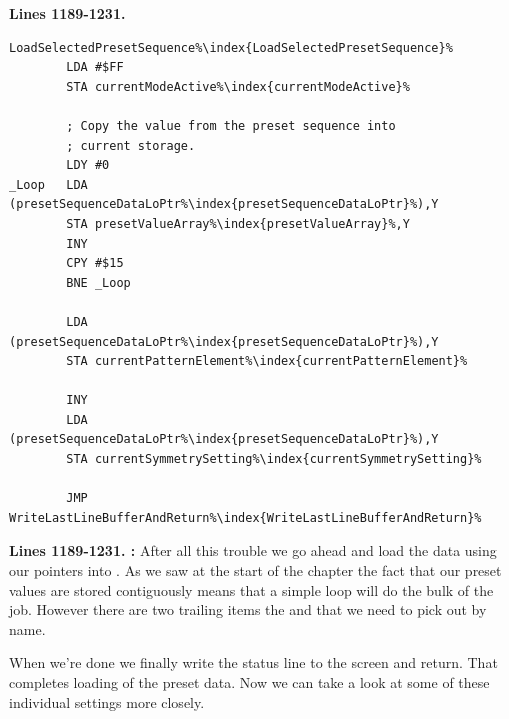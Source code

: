 \textbf{Lines 1189-1231. } 
\begin{lstlisting}[escapechar=\%]
LoadSelectedPresetSequence%\index{LoadSelectedPresetSequence}%    
        LDA #$FF
        STA currentModeActive%\index{currentModeActive}%

        ; Copy the value from the preset sequence into 
        ; current storage.
        LDY #0
_Loop   LDA (presetSequenceDataLoPtr%\index{presetSequenceDataLoPtr}%),Y
        STA presetValueArray%\index{presetValueArray}%,Y
        INY 
        CPY #$15
        BNE _Loop

        LDA (presetSequenceDataLoPtr%\index{presetSequenceDataLoPtr}%),Y
        STA currentPatternElement%\index{currentPatternElement}%

        INY 
        LDA (presetSequenceDataLoPtr%\index{presetSequenceDataLoPtr}%),Y
        STA currentSymmetrySetting%\index{currentSymmetrySetting}%

        JMP WriteLastLineBufferAndReturn%\index{WriteLastLineBufferAndReturn}%
\end{lstlisting}
\clearpage
\textbf{Lines 1189-1231. :} After all this trouble we go ahead and load the data using our pointers into 
. As we saw at the start of the chapter the fact that our preset values are stored contiguously means that a simple loop
will do the bulk of the job. However there are two trailing items the  and  that we need
to pick out by name. 

When we're done we finally write the status line to the screen and return. That completes loading of the preset data. Now we can take a look at some
of these individual settings more closely.

